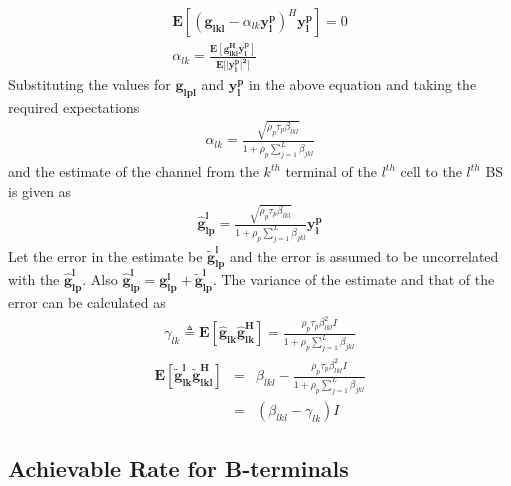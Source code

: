 \documentclass[10pt, a4paper, twoside,fleqn]{article}
\begin{document}
\begin{eqnarray}
	\mathbf{E}[(\mathbf{g_{lkl}}-\alpha_{lk}\mathbf{y_{l}^{p}})^H \mathbf{y_{l}^{p}}] = 0 \\
	\alpha_{lk} = \frac{\mathbf{E}[\mathbf{g^{H}_{lkl}} \mathbf{y_{l}^{p}}]}{\mathbf{E}[|\mathbf{y_{l}^{p}|^2]}}
\end{eqnarray}
Substituting the values for $\mathbf{g_{lpl}}$ and $\mathbf{y_{l}^{p}}$ in the above equation and taking the required expectations
\begin{eqnarray}\label{eq:alphapll}
	\alpha_{lk}=\frac{\sqrt{\rho_p \tau_p \beta_{lkl}}}{1+\rho_p\sum\limits_{j=1}^{L}\beta_{jkl}}
\end{eqnarray}
and the estimate of the channel from the $k^{th}$ terminal of the $l^{th}$ cell to the $l^{th}$ BS is given as
\begin{eqnarray}\label{eq:estimatehpll}
	\mathbf{\hat g_{lp}^{l}} = \frac{\sqrt{\rho_p\tau_p\beta_{lkl}}}{1+\rho_p\sum\limits_{j=1}^{L}\beta_{jkl}} \mathbf{y_{l}^{p}}
\end{eqnarray}
Let the error in the estimate be ${\mathbf{\widetilde{g}_{lp}^{l}}}$ and the error is assumed to be uncorrelated with the $\mathbf{\hat g_{lp}^{l}}$. Also $\mathbf{\hat g_{lp}^{l}} =\mathbf{g_{lp}^{l}}+\mathbf{\widetilde{g}_{lp}^{l}}$.
The variance of the estimate and that of the error can be calculated as
\begin{eqnarray}
	\gamma_{lk} \triangleq \mathbf{E}[\mathbf{\hat g_{lk}}\mathbf{\hat g^H_{lk}}]
                    =       \frac{\rho_p\tau_p\beta^2_{lkl}I}{1+\rho_p\sum\limits_{j=1}^{L}\beta_{jkl}} 
\end{eqnarray}
\begin{eqnarray}
    \mathbf{E}[\mathbf{\widetilde{g}_{lk}^{l}} \mathbf{\widetilde{g}^H_{lkl}}] &=& \beta_{lkl}- \frac{\rho_p\tau_p\beta^2_{lkl}I}{1+\rho_p\sum\limits_{j=1}^{L}\beta_{jkl}} \nonumber\\
          									    &=& (\beta_{lkl} - \gamma_{lk})I
\end{eqnarray}

\subsection{Achievable Rate for B-terminals}
\end{document}
